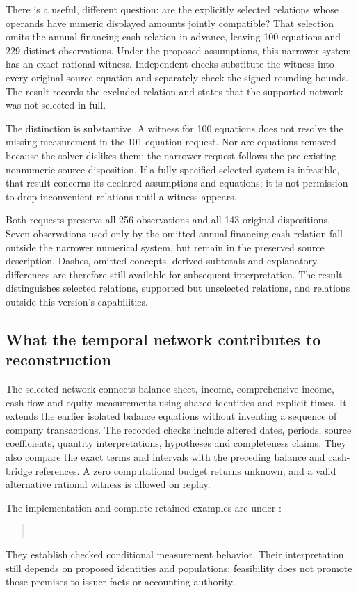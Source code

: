 There is a useful, different question: are the explicitly selected relations
whose operands have numeric displayed amounts jointly compatible? That selection
omits the annual financing-cash relation in advance, leaving 100 equations and
229 distinct observations. Under the proposed assumptions, this narrower system
has an exact rational witness. Independent checks substitute the witness into
every original source equation and separately check the signed rounding bounds.
The result records the excluded relation and states that the supported network
was not selected in full.

The distinction is substantive. A witness for 100 equations does not resolve
the missing measurement in the 101-equation request. Nor are equations removed
because the solver dislikes them: the narrower request follows the pre-existing
nonnumeric source disposition. If a fully specified selected system is
infeasible, that result concerns its declared assumptions and equations; it is
not permission to drop inconvenient relations until a witness appears.

Both requests preserve all 256 observations and all 143 original dispositions.
Seven observations used only by the omitted annual financing-cash relation
fall outside the narrower numerical system, but remain in the preserved source
description. Dashes, omitted concepts, derived subtotals and explanatory
differences are therefore still available for subsequent interpretation.
The result distinguishes selected relations, supported but unselected relations,
and relations outside this version's capabilities.

\subsection{What the temporal network contributes to reconstruction}

The selected network connects balance-sheet, income, comprehensive-income,
cash-flow and equity measurements using shared identities and explicit times.
It extends the earlier isolated balance equations without inventing a sequence
of company transactions. The recorded checks include altered dates, periods,
source coefficients, quantity interpretations, hypotheses and completeness
claims. They also compare the exact terms and intervals with the preceding
balance and cash-bridge references. A zero computational budget returns unknown,
and a valid alternative rational witness is allowed on replay.

The implementation and complete retained examples are under
:
\begin{quote}\small
{}\\
\end{quote}
They establish checked conditional measurement behavior. Their interpretation
still depends on proposed identities and populations; feasibility does not
promote those premises to issuer facts or accounting authority.

